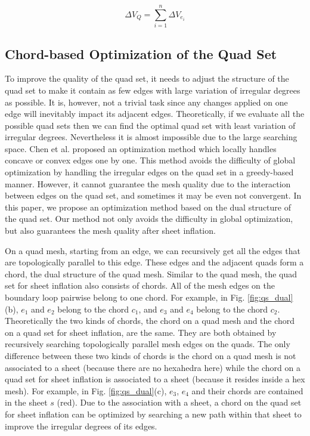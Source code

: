 \documentclass[final,5p,times,twocolumn]{elsarticle}
\begin{document}
\begin{equation}
\label{equ:qs_dif_irre_deg}
\Delta V_Q=\sum_{i=1}^{n}\Delta V_{e_i}
\end{equation}

\subsection{Chord-based Optimization of the Quad Set}
\label{sec:opt_qs_dual}
To improve the quality of the quad set, it needs to adjust the structure of the quad set to make it contain as few edges with large variation of irregular degrees as possible. It is, however, not a trivial task since any changes applied on one edge will inevitably impact its adjacent edges. Theoretically, if we evaluate all the possible quad sets then we can find the optimal quad set with least variation of irregular degrees. Nevertheless it is almost impossible due to the large searching space. Chen et al. proposed an optimization method which locally handles concave or convex edges one by one\cite{Chen:2015kf}. This method avoids the difficulty of global optimization by handling the irregular edges on the quad set in a greedy-based manner. However, it cannot guarantee the mesh quality due to the interaction between edges on the quad set, and sometimes it may be even not convergent. In this paper, we propose an optimization method based on the dual structure of the quad set. Our method not only avoids the difficulty in global optimization, but also guarantees the mesh quality after sheet inflation.

On a quad mesh, starting from an edge, we can recursively get all the edges that are topologically parallel to this edge. These edges and the adjacent quads form a chord, the dual structure of the quad mesh\cite{Murdoch:1997fy,Mitchell1996}. Similar to the quad mesh, the quad set for sheet inflation also consists of chords. All of the mesh edges on the boundary loop pairwise belong to one chord. For example, in Fig. \ref{fig:qs_dual}(b), $e_1$ and $e_2$ belong to the chord $c_1$, and $e_3$ and $e_4$ belong to the chord $c_2$. Theoretically the two kinds of chords, the chord on a quad mesh and the chord on a quad set for sheet inflation, are the same. They are both obtained by recursively searching topologically parallel mesh edges on the quads. The only difference between these two kinds of chords is the chord on a quad mesh is not associated to a sheet (because there are no hexahedra here) while the chord on a quad set for sheet inflation is associated to a sheet (because it resides inside a hex mesh). For example, in Fig. \ref{fig:qs_dual}(c), $e_3$, $e_4$ and their chords are contained in the sheet $s$ (red). Due to the association with a sheet, a chord on the quad set for sheet inflation can be optimized by searching a new path within that sheet to improve the irregular degrees of its edges.
\end{document}
